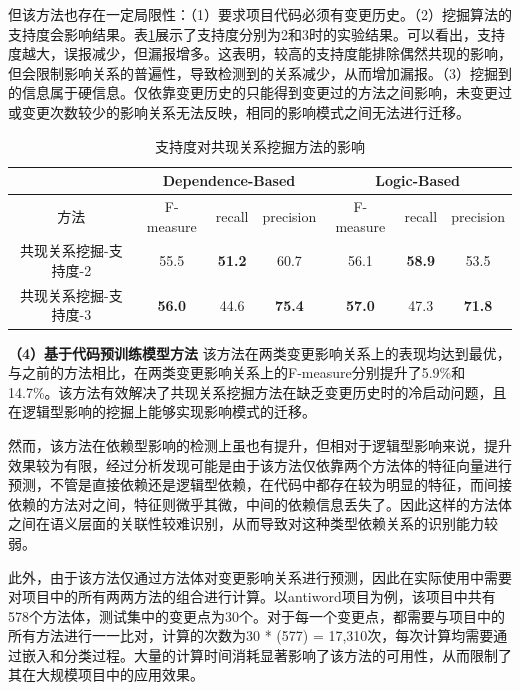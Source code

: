 但该方法也存在一定局限性：（1）要求项目代码必须有变更历史。（2）挖掘算法的支持度会影响结果。表\ref{1_支持度对共现关系挖掘方法的影响}展示了支持度分别为2和3时的实验结果。可以看出，支持度越大，误报减少，但漏报增多。这表明，较高的支持度能排除偶然共现的影响，但会限制影响关系的普遍性，导致检测到的关系减少，从而增加漏报。（3）挖掘到的信息属于硬信息。仅依靠变更历史的只能得到变更过的方法之间影响，未变更过或变更次数较少的影响关系无法反映，相同的影响模式之间无法进行迁移。
        
\begin{table}[htbp]
\caption{支持度对共现关系挖掘方法的影响}
\label{1_支持度对共现关系挖掘方法的影响}
\vspace{0.5em}\centering\wuhao
\begin{tabular}{c|ccc|ccc}
\toprule
  & \multicolumn{3}{c|}{Dependence-Based} & \multicolumn{3}{c}{Logic-Based}  \\
\midrule
方法 & F-measure & recall & precision & F-measure & recall & precision  \\
\midrule
共现关系挖掘-支持度-2 & 55.5 & \textbf{51.2} & 60.7 & 56.1 & \textbf{58.9} & 53.5 \\
共现关系挖掘-支持度-3 & \textbf{56.0} & 44.6 & \textbf{75.4} & \textbf{57.0} & 47.3 & \textbf{71.8} \\
\bottomrule
\end{tabular}
\end{table}

\textbf{（4）基于代码预训练模型方法} \hspace{2mm}该方法在两类变更影响关系上的表现均达到最优，与之前的方法相比，在两类变更影响关系上的F-measure分别提升了5.9\%和14.7\%。该方法有效解决了共现关系挖掘方法在缺乏变更历史时的冷启动问题，且在逻辑型影响的挖掘上能够实现影响模式的迁移。

然而，该方法在依赖型影响的检测上虽也有提升，但相对于逻辑型影响来说，提升效果较为有限，经过分析发现可能是由于该方法仅依靠两个方法体的特征向量进行预测，不管是直接依赖还是逻辑型依赖，在代码中都存在较为明显的特征，而间接依赖的方法对之间，特征则微乎其微，中间的依赖信息丢失了。因此这样的方法体之间在语义层面的关联性较难识别，从而导致对这种类型依赖关系的识别能力较弱。

此外，由于该方法仅通过方法体对变更影响关系进行预测，因此在实际使用中需要对项目中的所有两两方法的组合进行计算。以antiword项目为例，该项目中共有578个方法体，测试集中的变更点为30个。对于每一个变更点，都需要与项目中的所有方法进行一一比对，计算的次数为30 * (577) = 17,310次，每次计算均需要通过嵌入和分类过程。大量的计算时间消耗显著影响了该方法的可用性，从而限制了其在大规模项目中的应用效果。
    

